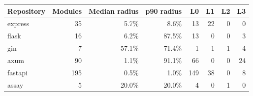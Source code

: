 \begin{tabular}{lrrrrrrr}
\toprule
Repository & Modules & Median radius & p90 radius & L0 & L1 & L2 & L3 \\
\midrule
express & 35 & 5.7\% & 8.6\% & 13 & 22 & 0 & 0 \\
flask & 16 & 6.2\% & 87.5\% & 13 & 0 & 0 & 3 \\
gin & 7 & 57.1\% & 71.4\% & 1 & 1 & 1 & 4 \\
axum & 90 & 1.1\% & 91.1\% & 66 & 0 & 0 & 24 \\
fastapi & 195 & 0.5\% & 1.0\% & 149 & 38 & 0 & 8 \\
assay & 5 & 20.0\% & 20.0\% & 4 & 0 & 1 & 0 \\
\bottomrule
\end{tabular}
